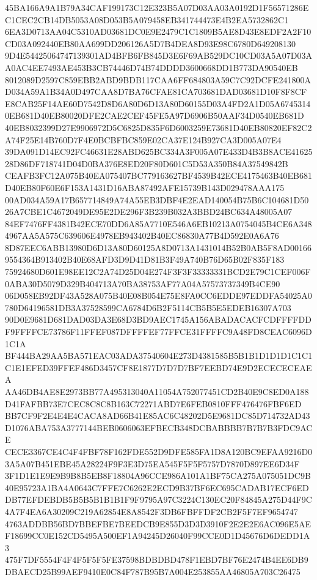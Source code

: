 \documentclass[UTF8,fontset=fandol,zihao=-4,a4paper]{ctexart}
\begin{document}
{{45BA166A9A1B79A34CAF199173C12E323B5A07D03AA03A0192D1F56571286EC1CEC2CB14DB5053A08D053B5A079458EB341744473E4B2EA5732862C1
6EA3D0713AA04C5310AD03681DC0E9E2479C1C1809B5AE8D43E8EDF2A2F10CD03A092440EB80AA699DD206126A5D7B4DEA8D93E98C6780D649208130
9D4E54425064747139301AD4BFB6FB845D3E6F69AB529DC10CD03A5A07D03AA0AC4EE7493AE453B3CB74446D74B74DDDD3600668DD1B773DA90540EB
8012089D2597C859EBB2ABD9BDB117CAA6FF684803A59C7C92DCFE241800AD034A59A1B34A0D497CAA8D7BA76CFAE81CA703681DAD03681D10F8F8CF
E8CAB25F14AE60D7542D8D6A80D6D13A80D60155D03A4FD2A1D05A67453140EB681D40EB80020DFE2CAE2CEF45FE5A97D6906B50AAF34D0540EB681D
40EB8032399D27E9906972D5C6825D835F6D6003259E73681D40EB80820EF82C2A74F25E14B760D7F4E0BCBFBC859E02CA37E124B927CA3D005A07E4
39DA091D14EC92FC46631E28ABD625BC334A3F005A07E433D4B3B8ACE4162528D86DF718741D04D0BA376E8ED20F80D601C5D53A350B84A37549842B
CEAFB3FC12A075B40EA075407BC779163627BF4539B42ECE4175463B40EB681D40EB80F60E6F153A1431D16ABA87492AFE15739B143D029478AAA175
00AD034A59A17B657714849A74A55EB3DBF4E2EAD140054B75B6C104681D5026A7CBE1C4672049DE95E2DE296F3B239B032A3BBD24BC634A48005A07
84EF7476FF4381B42ECE70DD6A85A7710E546A6EB10213A0754045B4CE6A3484967AA5A575C639606E4978EB943402B40EC86830A77B4D592E0A6A76
8D87EEC6ABB13980D6D13A80D60125A8D0713A1431014B52B0AB5F8AD001669554364B913402B40E68AFD3D9D41D81B3F49A740B76D65B02F835F183
75924680D601E98EE12C2A74D25D04E274F3F3F33333331BCD2E79C1CEF006F0ABA30D5079D329B404713A70BA38753AF77A04A57573737349B4CE90
06D058EB92DF43A528A075B40E08B054E75E8FA0CC6EDDE97EDDFA54025A0780D64196581DB3A37528599CA6784D6B2F5114CB5B5E5EDEB16307A703
90D0E9681D681DAD03DA3E68D3BD9AEC1745A156ABADACACFCDFFFFDDF9FFFFCE73786F11FFEF087DFFFFEF77FFCE31FFFFC9A48FD8CEAC6096D1C1A
BF444BA29AA5BA571EAC03ADA37540604E273D4381585B5B1B1D1D1D1C1C1C1E1EFED39FFEF486D3457CF8E1877D7D7D7BF7EEBD74E9D2ECECECEAEA
AA46DB4AE8E2973BB77A495313040A11054A752077451CD2B40E9C8ED0A188D41FAFBB73E7CEC8C8C8B163C72271ABD7E6FEB0810FFF476476FBF6ED
BB7CF9F2E4E4E4CACA8AD66B41E85AC6C48202D5E9681DC85D714732AD43D1076ABA753A3777144BEB0606063EFBECB348DCBABBBB7B7B7B3FDC9ACE
CECE3367CE4C4F4FBF78F162FDE552D9DFE585FA1D8A120BC9EFAA9216D03A5A07B451EBE45A28224F9F3E3D75EA545F5F5F5757D7870D897EE6D34F
3F1D1E1E9E9B9B8B5EB8F18804A96CCE986A101A1BF75CA275A075051DC9B40E95723A1BA4A0643C7FFE7C6262E2ECD9B37BF6EC695CADAB17ECF6ED
DB77EFDEBDB5B5B5B1B1B1F9F9795A97C3224C130EC20F84845A275D44F9C4A7F4EA6A30209C219A62854E8A8542F3DB6FBFFDF2CB2F5F7EF9654747
4763ADDBB56BD7BBEFBE7BEEDCB9E855D3D3D3910F2E2E2E6AC096E5AEF18699CC0E152CD5495A500EF1A94245D26040F99CCE0D1D45676D6DEDD1A3
475F7DF5554F4F4F5F5F5FE37598BDBDBD478F1EBD7BF76E2474B4EE6DB9DBAECD25B99AEF9410E0C84F787B95B7A004E253855AA46805A703C26475
}}
\end{document}
